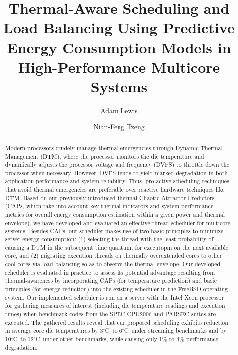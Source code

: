 \documentclass[times, 10pt,twocolumn]{IEEEtran}
\begin{document}
\title{Thermal-Aware Scheduling and Load Balancing Using Predictive
  Energy Consumption Models in High-Performance Multicore Systems} 
\author[]{Adam  Lewis} 
\author[]{Nian-Feng Tzeng} 
\maketitle
\newtheorem{defn}{Definition}
\newtheorem{thm}{Theorem}
\thispagestyle{empty}
\begin{abstract}
  Modern processors crudely manage thermal emergencies through Dynamic
  Thermal Management (DTM), where the processor monitors the die
  temperature and dynamically adjusts the processor voltage and
  frequency (DVFS) to throttle down the processor when necessary. However, DVFS tends to
  yield marked degradation in both application performance and system
  reliability. Thus, pro-active scheduling techniques that avoid thermal
  emergencies are preferable over reactive hardware techniques like
  DTM.  Based on our previously introduced thermal Chaotic Attractor Predictors
  (CAPs, which take into account key thermal indicators and system
  performance metrics for overall energy consumption estimation within a
  given power and thermal envelope), we have developed and evaluated an
  effective thread scheduler for multicore systems.  Besides CAPs, our
  scheduler makes use of two basic principles to minimize server energy
  consumption: (1) selecting the thread with the least
  probability of causing a DTM in the subsequent time quantum,
  for executopm on the next available core, and (2) migrating
  execution threads on thermally overextended cores to
  other cool cores via load balancing so as to observe the thermal envelope.
  Our developed scheduler is evaluated in practice to
  assess its potential advantage resulting from thermal-awareness by
  incorporating CAPs (for temperature prediction) and basic principles
  (for energy reduction) into the existing scheduler in the FreeBSD
  operating system.   Our implemented scheduler is run on a server with
  the Intel Xeon processor for gathering measures of interest (including
  die temperature readings and execution times) when benchmark codes
  from the SPEC CPU2006 and PARSEC suites are executed.  The gathered
  results reveal that our proposed scheduling exhibits reduction
  in average core die temperatures by 3$^{\circ}$C\ to 6$^{\circ}$C\ under
  streaming benchmarks and by 10$^{\circ}$C\ to 12$^{\circ}$C\
  under other benchmarks, while causing only 1\% to 4\% performance degradation.
\end{abstract}
\end{document}
